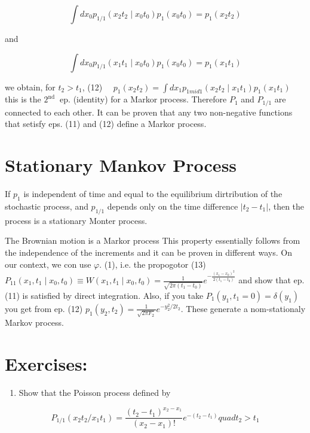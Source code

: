 $$ \int d x_{0} p_{1 / 1}
\left(x_{2} t_{2} \mid x_{0} t_{0}\right) p_{1}
\left(x_{0} t_{0}\right)=p_{1}
\left(x_{2} t_{2}\right) $$

and

$$ \int d x_{0} p_{1 / 1}
\left(x_{1} t_{1} \mid x_{0} t_{0}\right) p_{1}
\left(x_{0} t_{0}\right)=p_{1}
\left(x_{1} t_{1}\right) $$

we obtain, for $t_{2}>t_{1}$,
(12) $\quad p_{1}
\left(x_{2} t_{2}\right)=\int d x_{1} p_{1 
mid 1}
\left(x_{2} t_{2} \mid x_{1} t_{1}\right) p_{1}
\left(x_{1} t_{1}\right)$
this is the $2^{\text {nd }}$ ep. (identity) for a Markor process. Therefore $P_{1}$ and $P_{1 / 1}$ are connected to each other.
It can be proven that any two non-negative functions that setisfy eps. (11) and (12) define a Markor process.

\section*{Stationary Mankov Process}
If $p_{1}$ is independent of time and equal to the equilibrium dirtribution of the stochastic process, and $p_{1 / 1}$ depends only on the time difference $\left|t_{2}-t_{1}\right|$, then the process is a stationary Monter process.

The Brownian motion is a Markor process
This property essentially follows from the independence of the increments and it can be proven in different ways. On our context, we con use $\varphi$. (1), i.e. the propogotor
(13) $P_{11}
\left(x_{1}, t_{1} \mid x_{0}, t_{0}\right) \equiv W\left(x_{1}, t_{1} \mid x_{0}, t_{0}\right)=\frac{1}{\sqrt{2 \pi\left(t_{1}-t_{0}\right)}} e^{-\frac{\left(x_{1}-x_{0}\right)^{2}}{2\left(t_{1}-t_{0}\right)}}$
and show that ep. (11) is satisfied by direct integration. Also, if you take $P_{1}
\left(y_{1}, t_{1}=0\right)=\delta\left(y_{1}\right)$ you get from ep. (12) $p_{1}
\left(y_{2}, t_{2}\right)=\frac{1}{\sqrt{2 \pi F_{2}}} e^{-y_{2}^{2} / 2 t_{2}}$. These generate a nom-stationaly Markov process.

\section*{Exercises:}
\begin{enumerate}
  \item Show that the Poisson process defined by
\end{enumerate}

$$ P_{1 / 1}
\left(x_{2} t_{2} / x_{1} t_{1}\right)=\frac{\left(t_{2}-t_{1}\right)^{x_{2}-x_{1}}}{\left(x_{2}-x_{1}\right)!} e^{-\left(t_{2}-t_{1}\right)} 
quad t_{2}>t_{1} $$

